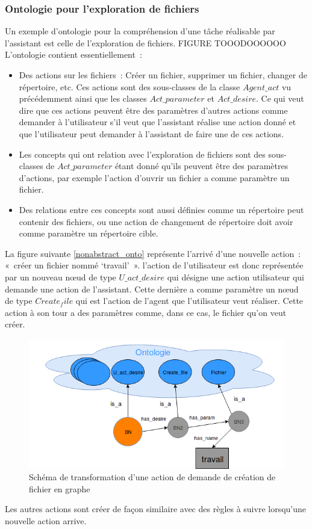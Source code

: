 		\subsubsection*{Ontologie pour l’exploration de fichiers}
		Un exemple d’ontologie pour la compréhension d’une tâche réalisable par l’assistant est celle de l’exploration de fichiers.
		FIGURE TOOODOOOOOO
		L’ontologie contient essentiellement :
		\begin{itemize}
			\item Des actions sur les fichiers : Créer un fichier, supprimer un fichier, changer de répertoire, etc. Ces actions sont des sous-classes de la classe  $Agent\_act$ vu précédemment ainsi que les classes $Act\_parameter$ et $Act\_desire$. Ce qui veut dire que ces actions peuvent être des paramètres d’autres actions comme demander à l’utilisateur s’il veut que l’assistant réalise une action donné et que l’utilisateur peut demander à l’assistant de faire une de ces actions. 
			\item Les concepts qui ont relation avec l’exploration de fichiers sont des sous-classes de $Act\_parameter$ étant donné qu’ils peuvent  être des paramètres d’actions, par exemple l’action d’ouvrir un fichier a comme paramètre un fichier.
			\item Des relations entre ces concepts sont aussi définies comme un répertoire peut contenir des fichiers, ou une action de changement de répertoire doit avoir comme paramètre un répertoire cible.
		\end{itemize}
	La figure suivante \ref{nonabstract_onto} représente l’arrivé d’une nouvelle action : « créer un fichier nommé ‘travail’ ». l’action de l’utilisateur est donc représentée par un nouveau nœud de type $U\_act\_desire$ qui désigne une action utilisateur qui demande une action de l’assistant. Cette dernière a comme paramètre un nœud de type $Create_file$ qui est l’action de l’agent que l’utilisateur veut réaliser. Cette action à son tour a des paramètres comme, dans ce cas, le fichier qu’on veut créer.
	\begin{figure}[H] 
		\centering
		\includegraphics[width=0.88\linewidth]{images/Conception/DM/nonabstract_onto.png}
		\caption{Schéma de transformation d'une action de demande de création de fichier en graphe}
		
	\end{figure}\label{nonabstract_onto}
Les autres actions sont créer de façon similaire avec des règles à suivre lorsqu’une nouvelle action arrive.
